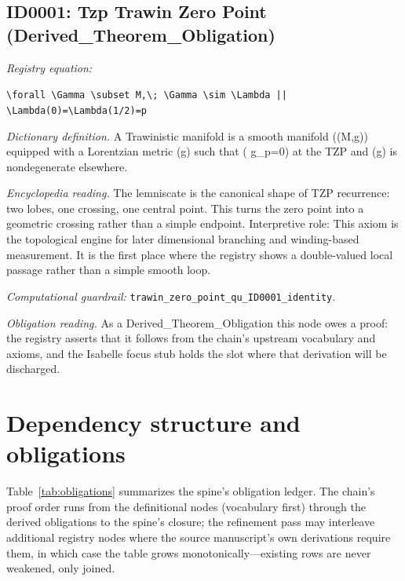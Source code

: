 \documentclass[11pt]{article}
\theoremstyle{remark}
\begin{document}
\subsection{ID0001: Tzp Trawin Zero Point (Derived\_Theorem\_Obligation)}

\noindent\textit{Registry equation:}\par
{\small\texttt{\textbackslash{}forall \textbackslash{}Gamma \textbackslash{}subset M,\textbackslash{}; \textbackslash{}Gamma \textbackslash{}sim \textbackslash{}Lambda || \textbackslash{}Lambda(0)=\textbackslash{}Lambda(1/2)=p}}\par\medskip
\noindent\textit{Dictionary definition.} A Trawinistic manifold is a smooth manifold ((M,g)) equipped with a Lorentzian metric (g) such that ( g\_p=0) at the TZP and (g) is nondegenerate elsewhere.\par\medskip
\noindent\textit{Encyclopedia reading.} The lemniscate is the canonical shape of TZP recurrence: two lobes, one crossing, one central point. This turns the zero point into a geometric crossing rather than a simple endpoint. Interpretive role: This axiom is the topological engine for later dimensional branching and winding-based measurement. It is the first place where the registry shows a double-valued local passage rather than a simple smooth loop.
\par\medskip\noindent\textit{Computational guardrail:} \texttt{trawin\_zero\_point\_qu\_ID0001\_identity}.
\par\medskip\noindent\textit{Obligation reading.} As a Derived\_Theorem\_Obligation this node owes a proof: the registry asserts that it follows from the chain's upstream vocabulary and axioms, and the Isabelle focus stub holds the slot where that derivation will be discharged.

\section{Dependency structure and obligations}
\label{sec:dep}

Table~\ref{tab:obligations} summarizes the spine's obligation ledger. The chain's proof order runs from the definitional nodes (vocabulary first) through the derived obligations to the spine's closure; the refinement pass may interleave additional registry nodes where the source manuscript's own derivations require them, in which case the table grows monotonically---existing rows are never weakened, only joined.
\end{document}
